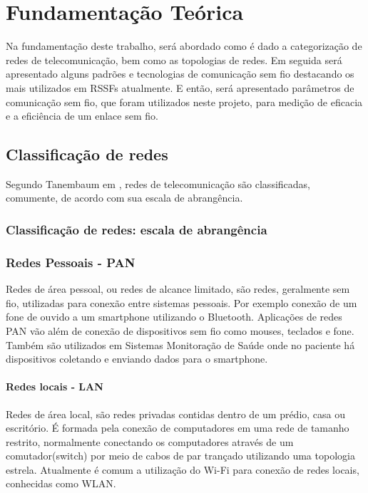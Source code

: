\chapter{Fundamentação Teórica}
\label{fundamentacao}
Na fundamentação deste trabalho, será abordado como é dado a categorização de redes de telecomunicação, bem como as topologias de redes. Em seguida será apresentado alguns padrões e tecnologias de comunicação sem fio destacando os mais utilizados em RSSFs atualmente. E então, será apresentado parâmetros de comunicação sem fio, que foram utilizados neste projeto, para medição de eficacia e a eficiência de um enlace sem fio.


\section{Classificação de redes}
\label{classRedes}
Segundo Tanembaum em \cite{tanembaum2011}, redes de telecomunicação são classificadas, comumente, de acordo com sua escala de abrangência.
\subsection{Classificação de redes: escala de abrangência}

\subsection{Redes Pessoais - PAN}
Redes de área pessoal, ou redes de alcance limitado, são redes, geralmente sem fio, utilizadas para conexão entre sistemas pessoais. Por exemplo conexão de um fone de ouvido a um smartphone utilizando o Bluetooth. Aplicações de redes PAN vão além de conexão de dispositivos sem fio como mouses, teclados e fone. Também são utilizados em Sistemas Monitoração de Saúde onde no paciente há dispositivos coletando e enviando dados para o smartphone.

\subsubsection{Redes locais - LAN}
Redes de área local, são redes privadas contidas dentro de um prédio, casa ou escritório. É formada pela conexão de computadores em uma rede de tamanho restrito, normalmente conectando os computadores através de um comutador(switch) por meio de cabos de par trançado utilizando uma topologia estrela. Atualmente é comum a utilização do Wi-Fi para conexão de redes locais, conhecidas como WLAN.

